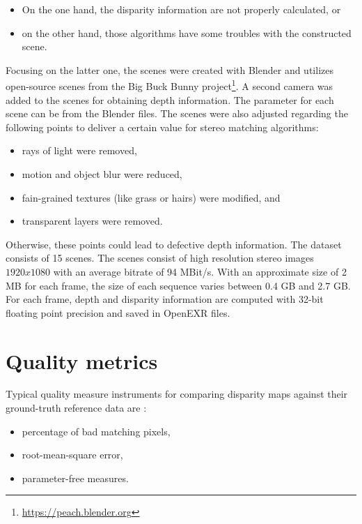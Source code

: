 \begin{itemize}
  \item On the one hand, the disparity information are not properly calculated, or
  \item on the other hand, those algorithms have some troubles with the constructed scene.
\end{itemize}

\noindent Focusing on the latter one, the scenes were created with Blender and utilizes open-source scenes from the Big Buck Bunny project\footnote{\url{https://peach.blender.org}}.
A second camera was added to the scenes for obtaining depth information.
The parameter for each scene can be from the Blender files.
The scenes were also adjusted regarding the following points to deliver a certain value for stereo matching algorithms:

\begin{itemize}
  \item rays of light were removed,
  \item motion and object blur were reduced,
  \item fain-grained textures (like grass or hairs) were modified, and
  \item transparent layers were removed.
\end{itemize}

\noindent Otherwise, these points could lead to defective depth information.
The dataset consists of 15 scenes.
The scenes consist of high resolution stereo images $1920x1080$ with an average bitrate of 94 MBit/s.
With an approximate size of 2 MB for each frame, the size of each sequence varies between 0.4 GB and 2.7 GB.
For each frame, depth and disparity information are computed with 32-bit floating point precision and saved in OpenEXR files.


\newpage

\section{Quality metrics}

Typical quality measure instruments for comparing disparity maps against their ground-truth reference data are  \citep{cyganek2011introduction}:

\begin{itemize}
  \item percentage of bad matching pixels,
  \item root-mean-square error,
  \item parameter-free measures.
\end{itemize}

